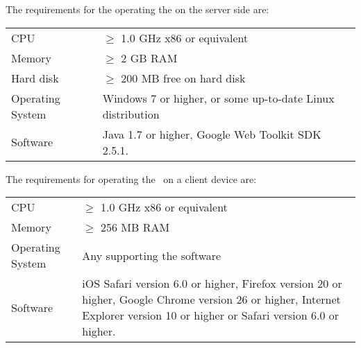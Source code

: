 \fpstartparagraph{} The requirements for the operating the \applicationname{} on the server side are:

\begin{center}
\begin{tabular}{p{} p{}}
CPU & $\geq$ 1.0 GHz x86 or equivalent \\
Memory & $\geq$ 2 GB RAM \\
Hard disk & $\geq$ 200 MB free on hard disk \\
Operating System & Windows 7 or higher, or some up-to-date Linux distribution\\
Software & Java 1.7 or higher, Google Web Toolkit SDK 2.5.1.\\
\end{tabular}
\end{center}

\begin{samepage}
\fpstartparagraph{} The requirements for operating the \applicationname\ on a client device are:

\begin{center}
\begin{tabular}{p{} p{}}
CPU & $\geq$ 1.0 GHz x86 or equivalent \\
Memory & $\geq$ 256 MB RAM \\
Operating System & Any supporting the software\\
Software & iOS Safari version 6.0 or higher, Firefox version 20 or higher, Google Chrome version 26 or higher, Internet Explorer version 10 or higher or Safari version 6.0 or higher.\\
\end{tabular}
\end{center}
\end{samepage}